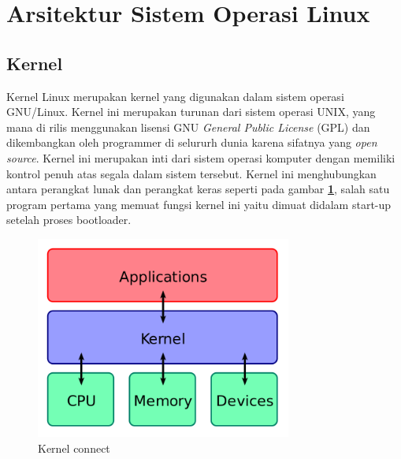 \section{Arsitektur Sistem Operasi Linux}
\subsection{Kernel}
	Kernel Linux merupakan kernel yang digunakan dalam sistem operasi GNU/Linux. Kernel ini merupakan turunan dari sistem operasi UNIX, yang mana di rilis menggunakan lisensi GNU \textit{General Public License} (GPL) dan dikembangkan oleh programmer di selururh dunia karena sifatnya yang \textit{open source}. Kernel ini merupakan inti dari sistem operasi komputer dengan memiliki kontrol penuh atas segala dalam sistem tersebut. Kernel ini menghubungkan antara perangkat lunak dan perangkat keras seperti pada gambar \textbf{\ref{kernel}}, salah satu program pertama yang memuat fungsi kernel ini yaitu dimuat didalam start-up setelah proses bootloader.

\begin{figure}[!htbp]
\centerline{\includegraphics[width=0.75\textwidth]{Figures/Kernel_Layout.png}}
\caption{Kernel connect}
\label{kernel}
\end{figure}

